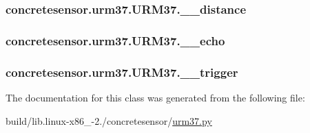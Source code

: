 \subsubsection[{\+\_\+\+\_\+distance}]{\setlength{\rightskip}{0pt plus 5cm}concretesensor.\+urm37.\+U\+R\+M37.\+\_\+\+\_\+distance\hspace{0.3cm}{\ttfamily [private]}}\label{classconcretesensor_1_1urm37_1_1URM37_a822064350a6fccb6e4d434f9db340f0f}
\hypertarget{classconcretesensor_1_1urm37_1_1URM37_af182d1830ad908fe03ca53b49230745c}{}
\subsubsection[{\+\_\+\+\_\+echo}]{\setlength{\rightskip}{0pt plus 5cm}concretesensor.\+urm37.\+U\+R\+M37.\+\_\+\+\_\+echo\hspace{0.3cm}{\ttfamily [private]}}\label{classconcretesensor_1_1urm37_1_1URM37_af182d1830ad908fe03ca53b49230745c}
\hypertarget{classconcretesensor_1_1urm37_1_1URM37_a867e5be11fa91b5ada70e1fa41eb7c55}{}
\subsubsection[{\+\_\+\+\_\+trigger}]{\setlength{\rightskip}{0pt plus 5cm}concretesensor.\+urm37.\+U\+R\+M37.\+\_\+\+\_\+trigger\hspace{0.3cm}{\ttfamily [private]}}\label{classconcretesensor_1_1urm37_1_1URM37_a867e5be11fa91b5ada70e1fa41eb7c55}


The documentation for this class was generated from the following file\+:\begin{DoxyCompactItemize}
\item 
build/lib.\+linux-\/x86\+\_-\/2./concretesensor/\hyperlink{build_2lib_8linux-x86__64-2_87_2concretesensor_2urm37_8py}{urm37.\+py}\end{DoxyCompactItemize}
